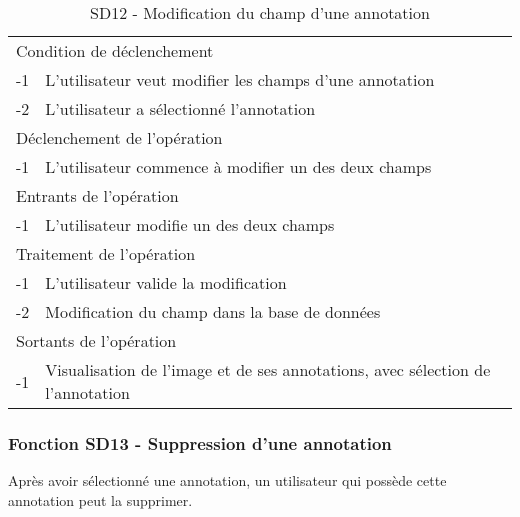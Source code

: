 \documentclass[a4paper]{article}
\begin{document}
\begin{table}[H]
  \centering
   \small
	\begin{tabular}{|c|p{12cm}|}
   		\hline
   			\rowcolor{lightgray}\multicolumn{2}{|c|}{\textbf{SD12 - Modification du champ d’une annotation}} \\
   		\hline
   			\multicolumn{2}{|l|}{Condition de d\'eclenchement} \\
   		\hline
   			-1 & L’utilisateur veut modifier les champs d’une annotation\\
			-2 & L’utilisateur a sélectionné l’annotation\\
   		\hline
   			\multicolumn{2}{|l|}{D\'eclenchement de l'op\'eration} \\
   		\hline
   			-1 & L’utilisateur commence à modifier un des deux champs\\
   		\hline
   			\multicolumn{2}{|l|}{Entrants de l'op\'eration} \\
   		\hline
   			-1 & L’utilisateur modifie un des deux champs\\
   		\hline
   			\multicolumn{2}{|l|}{Traitement de l'op\'eration} \\
  		\hline
   			-1 & L’utilisateur valide la modification\\
            -2 & Modification du champ dans la base de données\\
   		\hline
   			\multicolumn{2}{|l|}{Sortants de l'op\'eration} \\
   		\hline
   			-1 & Visualisation de l’image et de ses annotations, avec sélection de l’annotation\\
   		\hline
	\end{tabular}
  \caption{SD12 - Modification du champ d’une annotation}
  \normalsize
  \label{tab:modification_champ_annotation}
\end{table}

\subsubsection{Fonction SD13 - Suppression d'une annotation}
Après avoir sélectionné une annotation, un utilisateur qui possède cette annotation peut la supprimer.\\
\end{document}
